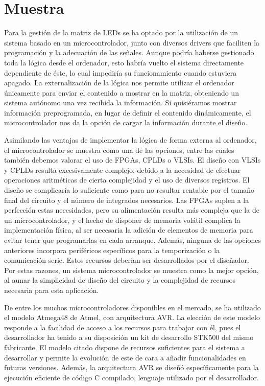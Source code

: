 \section{Muestra}

Para la gestión de la matriz de LEDs se ha optado por la utilización de un sistema basado en un microcontrolador, junto con diversos drivers que faciliten la programación y la adecuación de las señales. Aunque podría haberse gestionado toda la lógica desde el ordenador, esto habría vuelto el sistema directamente dependiente de éste, lo cual impediría su funcionamiento cuando estuviera apagado. La externalización de la lógica nos permite utilizar el ordenador únicamente para enviar el contenido a mostrar en la matriz, obteniendo un sistema autónomo una vez recibida la información. Si quisiéramos mostrar información preprogramada, en lugar de definir el contenido dinámicamente, el microcontrolador nos da la opción de cargar la información durante el diseño.

Asimilando las ventajas de implementar la lógica de forma externa al ordenador, el microcontrolador se muestra como una de las opciones, entre las cuales también debemos valorar el uso de FPGAs, CPLDs o VLSIs. El diseño con VLSIs y CPLDs resulta excesivamente complejo, debido a la necesidad de efectuar operaciones aritméticas de cierta complejidad y el uso de diversos registros. El diseño se complicaría lo suficiente como para no resultar rentable por el tamaño final del circuito y el número de integrados necesarios. Las FPGAs suplen a la perfección estas necesidades, pero su alimentación resulta más compleja que la de un microcontrolador, y el hecho de disponer de memoria volátil complica la implementación física, al ser necesaria la adición de elementos de memoria para evitar tener que programarlas en cada arranque. Además, ninguna de las opciones anteriores incorpora periféricos específicos para la temporización o la comunicación serie. Estos recursos deberían ser desarrollados por el diseñador. Por estas razones, un sistema microcontrolador se muestra como la mejor opción, al aunar la simplicidad de diseño del circuito y la complejidad de recursos necesaria para esta aplicación.

De entre los muchos microcontroladores disponibles en el mercado, se ha utilizado el modelo Atmega48 de Atmel\cite{atmega48}, con arquitectura AVR\cite{avr}. La elección de este modelo responde a la facilidad de acceso a los recursos para trabajar con él, pues el desarrollador ha tenido a su disposición un kit de desarrollo STK500\cite{stk500} del mismo fabricante. El modelo citado dispone de recursos suficientes para el sistema a desarrollar y permite la evolución de este de cara a añadir funcionalidades en futuras versiones. Además, la arquitectura AVR se diseñó específicamente para la ejecución eficiente de código C compilado, lenguaje utilizado por el desarrollador.


